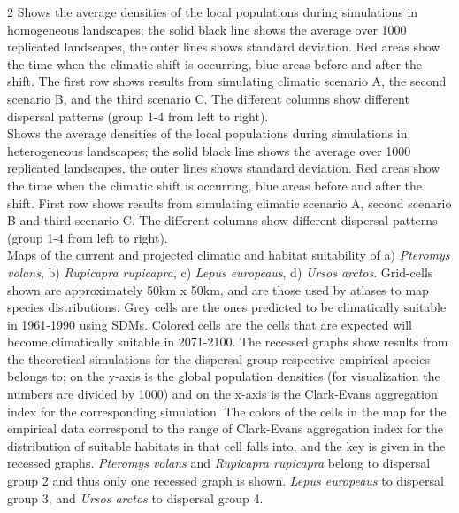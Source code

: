 \documentclass[12pt,pdftex]{article}
\begin{document}
\begin{spacing}{2}
 Shows the average densities of the local populations during simulations in homogeneous landscapes; the solid black line shows the average over 1000 replicated landscapes, the outer lines shows standard deviation. Red areas show the time when the climatic shift is occurring, blue areas before and after the shift. The first row shows results from simulating climatic scenario A, the second scenario B, and the third scenario C. The different columns show different dispersal patterns (group 1-4 from left to right).\\

 Shows the average densities of the local populations during simulations in heterogeneous landscapes; the solid black line shows the average over 1000 replicated landscapes, the outer lines shows standard deviation. Red areas show the time when the climatic shift is occurring, blue areas before and after the shift. First row shows results from simulating climatic scenario A, second scenario B and third scenario C. The different columns show different dispersal patterns (group 1-4 from left to right).\\

 Maps of the current and projected climatic and habitat suitability of a) {\em Pteromys volans}, b) {\em Rupicapra rupicapra}, c) {\em Lepus europeaus}, d) {\em Ursos arctos}. Grid-cells shown are approximately 50km x 50km, and are those used by atlases to map species distributions. Grey cells are the ones predicted to be climatically suitable in 1961-1990 using SDMs. Colored cells are the cells that are expected will become climatically suitable in 2071-2100. The recessed graphs show results from the theoretical simulations for the dispersal group respective empirical species belongs to; on the y-axis is the global population densities (for visualization the numbers are divided by 1000) and on the x-axis is the Clark-Evans aggregation index for the corresponding simulation. The colors of the cells in the map for the empirical data correspond to the range of Clark-Evans aggregation index for the distribution of suitable habitats in that cell falls into, and the key is given in the recessed graphs. {\em Pteromys volans} and {\em Rupicapra rupicapra} belong to dispersal group 2 and thus only one recessed graph is shown. {\em Lepus europeaus} to dispersal group 3, and {\em Ursos arctos} to dispersal group 4.



\end{spacing}
\end{document}

